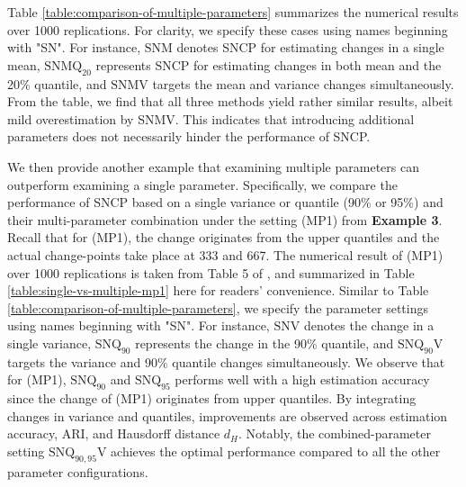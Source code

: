 
{ Table \ref{table:comparison-of-multiple-parameters} summarizes the numerical results over 1000 replications. For clarity, we specify these cases using names beginning with "SN". For instance, $\text{SNM}$ denotes SNCP for estimating changes in a single mean, $\text{SNMQ}_{20}$ represents SNCP for estimating changes in both mean and the 20\% quantile, and $\text{SNMV}$ targets the mean and variance changes simultaneously. From the table, we find that all three methods yield rather similar results, albeit mild overestimation by SNMV. This indicates that introducing additional parameters does not necessarily hinder the performance of SNCP.}

{We then provide another example that examining multiple parameters can outperform examining a single parameter. Specifically, we compare the performance of SNCP based on a single variance or quantile (90\% or 95\%) and their multi-parameter combination under the setting (MP1) from \textbf{Example 3}. Recall that for (MP1), the change originates from the upper quantiles and the actual change-points take place at 333 and 667. The numerical result of (MP1) over 1000 replications is taken from Table 5 of \cite{zhao2021segmenting}, and summarized in Table \ref{table:single-vs-multiple-mp1} here for readers' convenience. Similar to  Table \ref{table:comparison-of-multiple-parameters}, we specify the parameter settings using names beginning with "SN". For instance, $\text{SNV}$ denotes the change in a single variance, $\text{SNQ}_{90}$ represents the change in the 90\% quantile, and $\text{SNQ}_{90}\text{V}$ targets the variance and 90\% quantile changes simultaneously. We observe that for (MP1), $\text{SNQ}_{90}$ and $\text{SNQ}_{95}$ performs well with a high estimation accuracy since the change of (MP1) originates from upper quantiles. By integrating changes in variance and quantiles, improvements are observed across estimation accuracy, ARI, and Hausdorff distance $d_H$. Notably, the combined-parameter setting $\text{SNQ}_{90,95}\text{V}$ achieves the optimal performance compared to all the other parameter configurations. }

